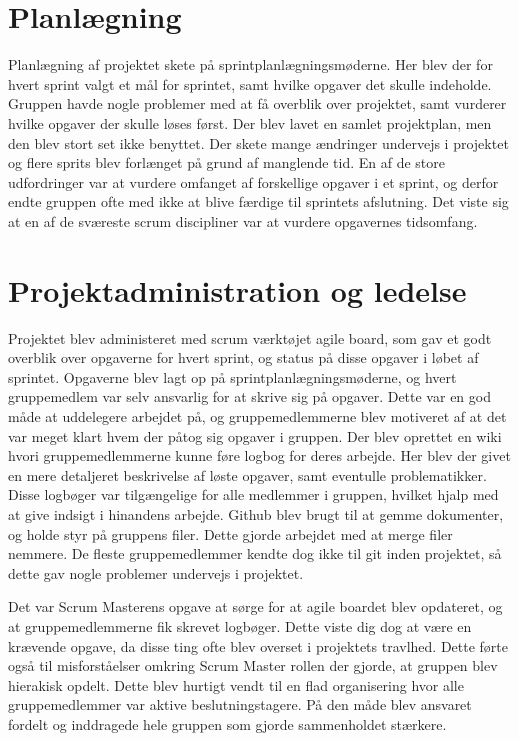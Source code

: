 \section*{Planlægning}
Planlægning af projektet skete på sprintplanlægningsmøderne. Her blev der for hvert sprint valgt et mål for sprintet, samt hvilke opgaver det skulle indeholde. Gruppen havde nogle problemer med at få overblik over projektet, samt vurderer hvilke opgaver der skulle løses først. Der blev lavet en samlet projektplan, men den blev stort set ikke benyttet.
Der skete mange ændringer undervejs i projektet og flere sprits blev forlænget på grund af manglende tid. En af de store udfordringer var at vurdere omfanget af forskellige opgaver i et sprint, og derfor endte gruppen ofte med ikke at blive færdige til sprintets afslutning. Det viste sig at en af de sværeste scrum discipliner var at vurdere opgavernes tidsomfang.

\section*{Projektadministration og ledelse}
Projektet blev administeret med scrum værktøjet agile board, som gav et godt overblik over opgaverne for hvert sprint, og status på disse opgaver i løbet af sprintet. Opgaverne blev lagt op på sprintplanlægningsmøderne, og hvert gruppemedlem var selv ansvarlig for at skrive sig på opgaver. Dette var en god måde at uddelegere arbejdet på, og gruppemedlemmerne blev motiveret af at det var meget klart hvem der påtog sig opgaver i gruppen. 
Der blev oprettet en wiki hvori gruppemedlemmerne kunne føre logbog for deres arbejde. Her blev der givet en mere detaljeret beskrivelse af løste opgaver, samt eventulle problematikker. Disse logbøger var tilgængelige for alle medlemmer i gruppen, hvilket hjalp med at give indsigt i hinandens arbejde.
Github blev brugt til at gemme dokumenter, og holde styr på gruppens filer. Dette gjorde arbejdet med at merge filer nemmere. De fleste gruppemedlemmer kendte dog ikke til git inden projektet, så dette gav nogle problemer undervejs i projektet.

Det var Scrum Masterens opgave at sørge for at agile boardet blev opdateret, og at gruppemedlemmerne fik skrevet logbøger. Dette viste dig dog at være en krævende opgave, da disse ting ofte blev overset i projektets travlhed. 
Dette førte også til misforståelser omkring Scrum Master rollen der gjorde, at gruppen blev hierakisk opdelt. Dette blev hurtigt vendt til en flad organisering hvor alle gruppemedlemmer var aktive beslutningstagere. På den måde blev ansvaret fordelt og inddragede hele gruppen som gjorde sammenholdet stærkere.

